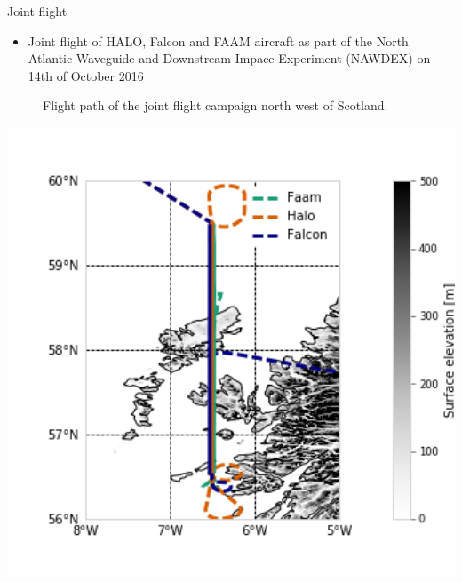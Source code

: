\documentclass[final,hyperref={pdfpagelabels=false}]{beamer}
\begin{document}
\begin{frame}
\begin{columns}[t]
\begin{column}{.48\linewidth}
\begin{block}{Joint flight}
          \begin{minipage}[t]{0.6\textwidth}
            \vspace{0pt}
            \begin{itemize}
            \item Joint flight of HALO, Falcon and FAAM aircraft as part of the
              North Atlantic Waveguide and Downstream Impace Experiment (NAWDEX)
              on 14th of October 2016
            \end{itemize}
            \begin{minipage}[b]{0.4\textwdith}
              \vspace{0pt}
              \rule{0pt}{5cm}
            \end{minipage}\hfill%
            \begin{minipage}[b]{0.5\textwidth}
              \vspace{1cm}
              \begin{figure}
              \caption{Flight path of the joint flight campaign  north west of Scotland.}
              \end{figure}
            \end{minipage}
          \end{minipage}%
          \begin{minipage}[t]{0.38\textwidth}
            \vspace{-2cm}
            \includegraphics[width=1.0\textwidth]{../plots/flight_path.png}
          \end{minipage}%


\end{block}
\end{column}
\end{columns}
\end{frame}
\end{document}
